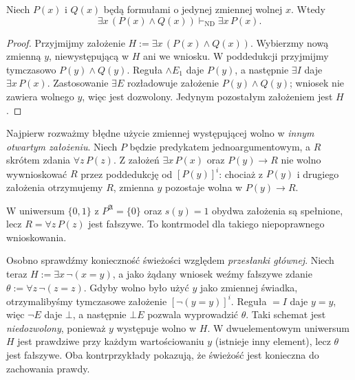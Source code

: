 \begin{twierdzenie}
\label{thm:nd-exists-projection}
Niech $P(x)$ i $Q(x)$ będą formułami o jedynej zmiennej wolnej $x$.
Wtedy
\[
\exists x\,(P(x)\land Q(x))
\vdash_{\mathrm{ND}}\exists x\,P(x).
\]
\end{twierdzenie}
\begin{proof}
Przyjmijmy założenie $H:=\exists x\,(P(x)\land Q(x))$.
Wybierzmy nową zmienną $y$, niewystępującą w $H$ ani
we wniosku. W poddedukcji przyjmijmy tymczasowo
$P(y)\land Q(y)$. Reguła $\land E_1$ daje $P(y)$,
a następnie $\exists I$ daje $\exists x\,P(x)$.
Zastosowanie $\exists E$ rozładowuje założenie
$P(y)\land Q(y)$; wniosek nie zawiera wolnego $y$,
więc jest dozwolony. Jedynym pozostałym założeniem jest $H$.
\end{proof}

\begin{przyklad}
\label{ex:nd-exists-major-premise-fresh-46}
Najpierw rozważmy błędne użycie zmiennej występującej wolno
w \emph{innym otwartym założeniu}. Niech $P$ będzie
predykatem jednoargumentowym, a $R$ skrótem zdania
$\forall z\,P(z)$. Z założeń
$\exists x\,P(x)$ oraz $P(y)\to R$ nie wolno
wywnioskować $R$ przez poddedukcję od $[P(y)]^i$:
chociaż z $P(y)$ i drugiego założenia otrzymujemy $R$,
zmienna $y$ pozostaje wolna w $P(y)\to R$.

W uniwersum $\{0,1\}$ z $P^{\mathfrak A}=\{0\}$
oraz $s(y)=1$ obydwa założenia są spełnione,
lecz $R=\forall z\,P(z)$ jest fałszywe.
To kontrmodel dla takiego niepoprawnego wnioskowania.

Osobno sprawdźmy konieczność świeżości względem
\emph{przesłanki głównej}. Niech teraz
$H:=\exists x\,\neg(x=y)$, a jako żądany wniosek
weźmy fałszywe zdanie
$\theta:=\forall z\,\neg(z=z)$.
Gdyby wolno było użyć $y$ jako zmiennej świadka,
otrzymalibyśmy tymczasowe założenie
$[\neg(y=y)]^i$. Reguła $=I$ daje $y=y$,
więc $\neg E$ daje $\bot$, a następnie $\bot E$
pozwala wyprowadzić $\theta$.
Taki schemat jest \emph{niedozwolony}, ponieważ $y$
występuje wolno w $H$.
W dwuelementowym uniwersum $H$ jest prawdziwe
przy każdym wartościowaniu $y$ (istnieje inny element),
lecz $\theta$ jest fałszywe.
Oba kontrprzykłady pokazują, że świeżość
jest konieczna do zachowania prawdy.
\end{przyklad}

